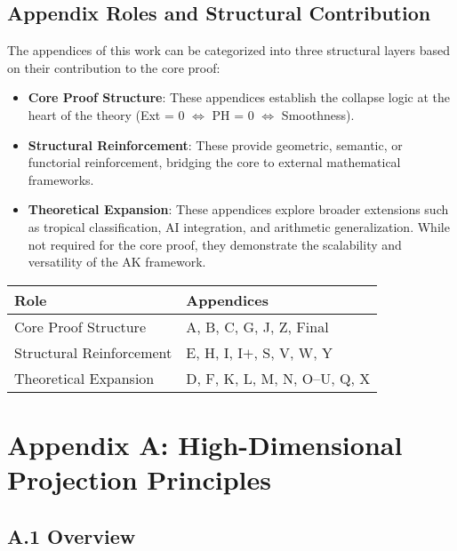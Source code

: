 \documentclass[11pt]{article}
\begin{document}
\subsection*{Appendix Roles and Structural Contribution}

The appendices of this work can be categorized into three structural layers based on their contribution to the core proof:

\begin{itemize}
  \item \textbf{Core Proof Structure}: These appendices establish the collapse logic at the heart of the theory (Ext = 0 $\Leftrightarrow$ PH = 0 $\Leftrightarrow$ Smoothness).
  \item \textbf{Structural Reinforcement}: These provide geometric, semantic, or functorial reinforcement, bridging the core to external mathematical frameworks.
  \item \textbf{Theoretical Expansion}: These appendices explore broader extensions such as tropical classification, AI integration, and arithmetic generalization. While not required for the core proof, they demonstrate the scalability and versatility of the AK framework.
\end{itemize}

\vspace{1em}

\begin{center}
\begin{tabular}{ll}
\toprule
\textbf{Role} & \textbf{Appendices} \\
\midrule
Core Proof Structure & A, B, C, G, J, Z, Final \\
Structural Reinforcement & E, H, I, I$+$, S, V, W, Y \\
Theoretical Expansion & D, F, K, L, M, N, O--U, Q, X \\
\bottomrule
\end{tabular}
\end{center}



\section*{Appendix A: High-Dimensional Projection Principles}

\subsection*{A.1 Overview}
\end{document}

